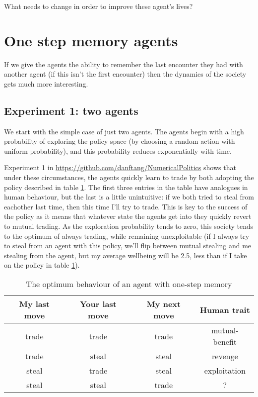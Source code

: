 \documentclass[a4paper]{report}
\begin{document}
What needs to change in order to improve these agent's lives?

\section{One step memory agents}

If we give the agents the ability to remember the last encounter they had with another agent (if this isn't the first encounter) then the dynamics of the society gets much more interesting.

\subsection{Experiment 1: two agents}

We start with the simple case of just two agents. The agents begin with a high probability of exploring the policy space (by choosing a random action with uniform probability), and this probability reduces exponentially with time.

Experiment 1 in \url{https://github.com/danftang/NumericalPolitics} shows that under these circumstances, the agents quickly learn to trade by both adopting the policy described in table \ref{optimalpolicy1}. The first three entries in the table have analogues in human behaviour, but the last is a little unintuitive: if we both tried to steal from eachother last time, then this time I'll try to trade. This is key to the success of the policy as it means that whatever state the agents get into they quickly revert to mutual trading. As the exploration probability tends to zero, this society tends to the optimum of always trading, while remaining unexploitable (if I always try to steal from an agent with this policy, we'll flip between mutual stealing and me stealing from the agent, but my average wellbeing will be 2.5, less than if I take on the policy in table \ref{optimalpolicy1}).


\begin{table}
	\begin{center}
		\begin{tabular}{cccc}
My last move & Your last move & My next move & Human trait\\
\hline
trade & trade &  trade &	 mutual-benefit \\
trade & steal &  steal &	 revenge \\
steal & trade &  steal &	 exploitation \\
steal & steal &  trade &	 ? \\
\hline
\end{tabular}
\end{center}
\caption{The optimum behaviour of an agent with one-step memory}
\label{optimalpolicy1}
\end{table}
\end{document}
